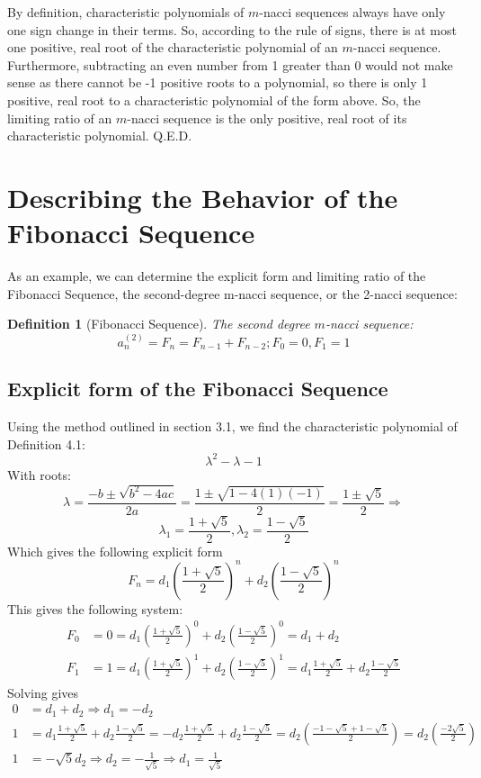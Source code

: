 \documentclass[11pt]{article}
\newtheorem{definition}[theorem]{Definition}
\begin{document}
By definition, characteristic polynomials of \(m\)-nacci sequences always have only one sign change in their terms. So, according to the rule of signs, there is at most one positive, real root of the characteristic polynomial of an \(m\)-nacci sequence. 
Furthermore, subtracting an even number from 1 greater than 0 would not make sense as there cannot be -1 positive roots to a polynomial, so there is only 1 positive, real root to a characteristic polynomial of the form above. So, the limiting ratio of an \(m\)-nacci sequence is the only positive, real root of its characteristic polynomial. Q.E.D.



\section{Describing the Behavior of the Fibonacci Sequence}

As an example, we can determine the explicit form and limiting ratio of the Fibonacci Sequence, the second-degree m-nacci sequence, or the 2-nacci sequence:

\begin{definition}[Fibonacci Sequence]The second degree \(m\)-nacci sequence:
    \[a_{n}^{(2)}=F_n=F_{n-1}+F_{n-2}; F_0=0, F_1=1\]
\end{definition}

\subsection{Explicit form of the Fibonacci Sequence}
Using the method outlined in section 3.1, we find the characteristic polynomial of Definition 4.1:
$$\lambda^2-\lambda-1$$
With roots:
\[\lambda=\frac{-b\pm\sqrt{b^2-4ac}}{2a}=\frac{1\pm\sqrt{1-4(1)(-1)}}{2}=\frac{1\pm\sqrt{5}}{2}\Rightarrow\]
$$\lambda_1=\frac{1+\sqrt{5}}{2},\lambda_2=\frac{1-\sqrt{5}}{2}$$
Which gives the following explicit form
$$F_n=d_1\left(\frac{1+\sqrt{5}}{2}\right)^n+d_2\left(\frac{1-\sqrt{5}}{2}\right)^n$$
This gives the following system:
\begin{align*}
    F_0&=0=d_1\left(\frac{1+\sqrt{5}}{2}\right)^0+d_2\left(\frac{1-\sqrt{5}}{2}\right)^0 = d_1+d_2 \\
    F_1&=1=d_1\left(\frac{1+\sqrt{5}}{2}\right)^1+d_2\left(\frac{1-\sqrt{5}}{2}\right)^1 = d_1\frac{1+\sqrt{5}}{2}+d_2\frac{1-\sqrt{5}}{2}
\end{align*}
Solving gives 
\begin{align*}
    0 &= d_1+d_2 \Rightarrow d_1=-d_2\\
    1 &= d_1\frac{1+\sqrt{5}}{2}+d_2\frac{1-\sqrt{5}}{2} = -d_2\frac{1+\sqrt{5}}{2}+d_2\frac{1-\sqrt{5}}{2}= d_2\left(\frac{-1-\sqrt{5}+1-\sqrt{5}}{2}\right)= d_2\left(\frac{-2\sqrt{5}}{2}\right) \\
    1 &= -\sqrt{5}d_2\Rightarrow d_2=-\frac{1}{\sqrt{5}} \Rightarrow d_1=\frac{1}{\sqrt{5}}
\end{align*}
\end{document}
